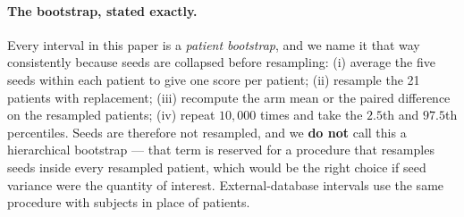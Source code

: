 \paragraph{The bootstrap, stated exactly.} Every interval in this paper is a
\emph{patient bootstrap}, and we name it that way consistently because seeds are
collapsed before resampling: (i) average the five seeds within each patient to
give one score per patient; (ii) resample the 21 patients with replacement;
(iii) recompute the arm mean or the paired difference on the resampled patients;
(iv) repeat $10{,}000$ times and take the $2.5$th and $97.5$th percentiles.
Seeds are therefore not resampled, and we \textbf{do not} call this a
hierarchical bootstrap --- that term is reserved for a procedure that resamples
seeds inside every resampled patient, which would be the right choice if
seed variance were the quantity of interest. External-database intervals use the
same procedure with subjects in place of patients.
